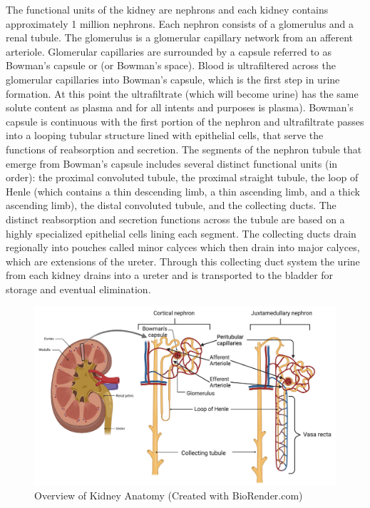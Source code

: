 The functional units of the kidney are nephrons and each kidney contains approximately 1 million nephrons. Each nephron consists of a glomerulus and a renal tubule. The glomerulus is a glomerular capillary network from an afferent arteriole. Glomerular capillaries are surrounded by a capsule referred to as Bowman’s capsule or (or Bowman’s space).  Blood is ultrafiltered across the glomerular capillaries into Bowman’s capsule, which is the first step in urine formation. At this point the ultrafiltrate (which will become urine) has the same solute content as plasma and for all intents and purposes is plasma). Bowman’s capsule is continuous with the first portion of the nephron and ultrafiltrate passes into a looping tubular structure lined with epithelial cells, that serve the functions of reabsorption and secretion. 
The segments of the nephron tubule that emerge from Bowman’s capsule includes several distinct functional units (in order): the proximal convoluted tubule, the proximal straight tubule, the loop of Henle (which contains a thin descending limb, a thin ascending limb, and a thick ascending limb), the distal convoluted tubule, and the collecting ducts. The distinct reabsorption and secretion functions across the tubule are based on a highly specialized epithelial cells lining each segment. The collecting ducts drain regionally into pouches called minor calyces which then drain into major calyces, which are extensions of the ureter. Through this collecting duct system the urine from each kidney drains into a ureter and is transported to the bladder for storage and eventual elimination.

\begin{figure}[!h]
    \centering
    \includegraphics[width=1.0\linewidth]{./figure/Kidney_Anatomy.png}
    \caption{Overview of Kidney Anatomy \footnotesize{(Created with BioRender.com)}}
    \label{fig:Kidney_Anatomy}
\end{figure}


